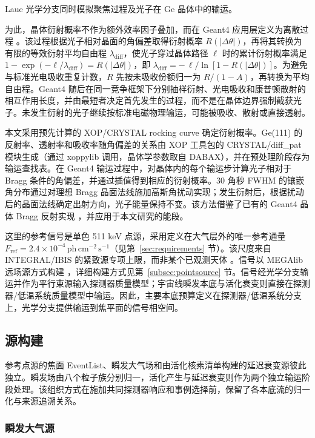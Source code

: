 \documentclass[11pt]{article}
\newcommand{\revblue}[1]{\textcolor{revisionblue}{#1}}
\newcommand{\phcms}{\,\mathrm{ph\,cm^{-2}\,s^{-1}}}
\newcommand{\fref}{F_{\mathrm{ref}}}
\begin{document}
Laue 光学分支同时模拟聚焦过程及光子在 Ge 晶体中的输运。

为此，晶体衍射概率不作为额外效率因子叠加，而在 Geant4 应用层定义为离散过程 \cite{Agostinelli2003,Allison2016}。该过程根据光子相对晶面的角偏差取得衍射概率 $R(|\Delta\theta|)$，再将其转换为有限的等效衍射平均自由程 $\lambda_{\mathrm{diff}}$，使光子穿过晶体路径 $\ell$ 时的累计衍射概率满足 $1-\exp(-\ell/\lambda_{\mathrm{diff}})=R(|\Delta\theta|)$，即 $\lambda_{\mathrm{diff}}=-\,\ell/\ln[1-R(|\Delta\theta|)]$。为避免与标准光电吸收重复计数，$R$ 先按未吸收份额归一为 $R/(1-A)$，再转换为平均自由程。Geant4 随后在同一竞争框架下分别抽样衍射、光电吸收和康普顿散射的相互作用长度，并由最短者决定首先发生的过程，而不是在晶体边界强制截获光子。未发生衍射的光子继续按标准电磁物理输运，可能被吸收、散射或直接透射。

本文采用预先计算的 XOP/CRYSTAL rocking curve 确定衍射概率。Ge(111) 的反射率、透射率和吸收率随角偏差的关系由 XOP 工具包的 CRYSTAL/diff\_pat 模块生成（通过 xoppylib 调用，晶体学参数取自 DABAX）\cite{SanchezDelRio2011XOP}，并在预处理阶段存为输运查找表。在 Geant4 输运过程中，对晶体内的每个输运步计算光子相对于 Bragg 条件的角偏差，并通过插值得到相应的衍射概率。30 角秒 FWHM 的镶嵌角分布通过对理想 Bragg 晶面法线施加高斯角扰动实现；发生衍射后，根据扰动后的晶面法线确定出射方向，光子能量保持不变。该方法借鉴了已有的 Geant4 晶体 Bragg 反射实现 \cite{Guan2023BraggReflection,Reiazi2025G4BraggReflection}，并应用于本文研究的能段。

这里的参考信号是单色 511 keV 点源，采用定义在大气层外的唯一参考通量 $\fref=2.4\times10^{-4}\phcms$（见第~\ref{sec:requirements} 节）。该尺度来自 INTEGRAL/IBIS 的紧致源专项上限，而非某个已观测天体 \cite{DeCesare2011}。信号以 MEGAlib 远场源方式构建 \cite{Zoglauer2006}，详细构建方式见第~\ref{subsec:pointsource} 节。信号经光学分支输运并作为平行束源输入探测器质量模型；宇宙线瞬发本底与活化衰变则直接在探测器/低温系统质量模型中输运。因此，主要本底预算定义在探测器/低温系统分支上，光学分支提供输运到焦平面的信号相空间。

\subsection{源构建}
\label{sec:background}

参考点源的焦面 EventList、瞬发大气场和由活化核素清单构建的延迟衰变源彼此独立。\revblue{瞬发场由八个粒子族分别归一}，活化产生与延迟衰变则作为两个独立输运阶段处理。该组织方式在施加共同探测器响应和事例选择前，保留了各本底流的归一化与来源追溯关系。

\subsubsection{瞬发大气源}
\label{subsec:prompt_source}
\end{document}
